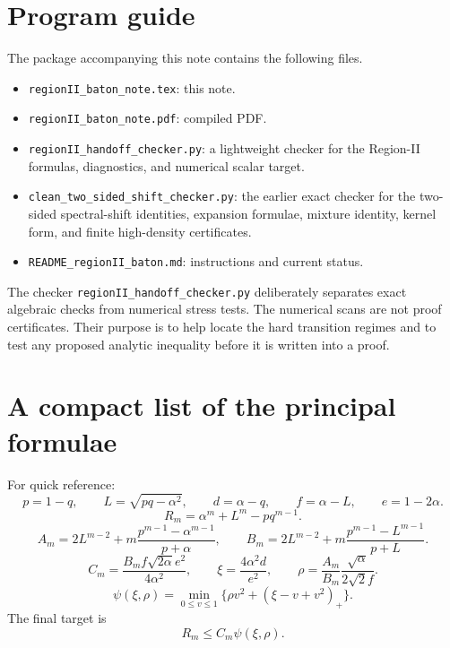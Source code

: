 \documentclass[11pt]{article}
\begin{document}
\section{Program guide}

The package accompanying this note contains the following files.
\begin{itemize}
\item \texttt{regionII\_baton\_note.tex}: this note.
\item \texttt{regionII\_baton\_note.pdf}: compiled PDF.
\item \texttt{regionII\_handoff\_checker.py}: a lightweight checker for the
Region-II formulas, diagnostics, and numerical scalar target.
\item \texttt{clean\_two\_sided\_shift\_checker.py}: the earlier exact checker
for the two-sided spectral-shift identities, expansion formulae, mixture
identity, kernel form, and finite high-density certificates.
\item \texttt{README\_regionII\_baton.md}: instructions and current status.
\end{itemize}

The checker \texttt{regionII\_handoff\_checker.py} deliberately separates
exact algebraic checks from numerical stress tests.  The numerical scans
are not proof certificates.  Their purpose is to help locate the hard
transition regimes and to test any proposed analytic inequality before it
is written into a proof.

\section{A compact list of the principal formulae}

For quick reference:
\[
        p=1-q,
        \qquad
        L=\sqrt{pq-\alpha^2},
        \qquad
        d=\alpha-q,
        \qquad
        f=\alpha-L,
        \qquad
        e=1-2\alpha.
\]
\[
        R_m=\alpha^m+L^m-pq^{m-1}.
\]
\[
        A_m=2L^{m-2}+m\frac{p^{m-1}-\alpha^{m-1}}{p+\alpha},
        \qquad
        B_m=2L^{m-2}+m\frac{p^{m-1}-L^{m-1}}{p+L}.
\]
\[
        C_m=\frac{B_mf\sqrt{2\alpha}e^2}{4\alpha^2},
        \qquad
        \xi=\frac{4\alpha^2d}{e^2},
        \qquad
        \rho=\frac{A_m}{B_m}\frac{\sqrt\alpha}{2\sqrt2 f}.
\]
\[
        \psi(\xi,\rho)=
        \min_{0\le v\le1}\{\rho v^2+(\xi-v+v^2)_+\}.
\]
The final target is
\[
        R_m\le C_m\psi(\xi,\rho).
\]
\end{document}
